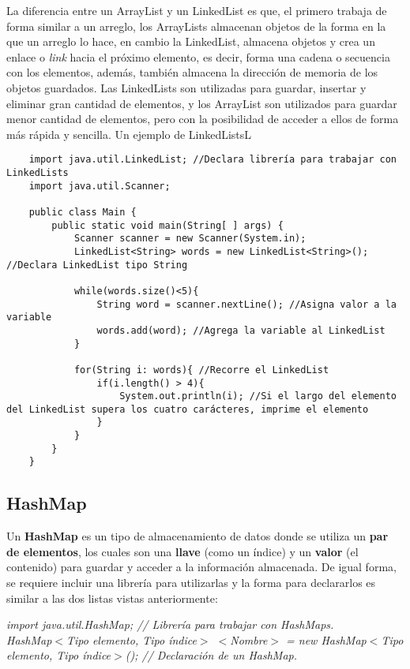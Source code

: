 La diferencia entre un ArrayList y un LinkedList es que, el primero trabaja de forma similar a un arreglo, los ArrayLists almacenan objetos de la forma en la que un arreglo lo hace, en cambio la LinkedList, almacena objetos y crea un enlace o \textit{link} hacia el próximo elemento, es decir, forma una cadena o secuencia con los elementos, además, también almacena la dirección de memoria de los objetos guardados. Las LinkedLists son utilizadas para guardar, insertar y eliminar gran cantidad de elementos, y los ArrayList son utilizados para guardar menor cantidad de elementos, pero con la posibilidad de acceder a ellos de forma más rápida y sencilla. Un ejemplo de LinkedListsL
\begin{lstlisting}
    import java.util.LinkedList; //Declara librería para trabajar con LinkedLists
    import java.util.Scanner;

    public class Main {
        public static void main(String[ ] args) {
	        Scanner scanner = new Scanner(System.in);
            LinkedList<String> words = new LinkedList<String>(); //Declara LinkedList tipo String
        
            while(words.size()<5){
                String word = scanner.nextLine(); //Asigna valor a la variable
                words.add(word); //Agrega la variable al LinkedList
            }
        
            for(String i: words){ //Recorre el LinkedList
                if(i.length() > 4){
                    System.out.println(i); //Si el largo del elemento del LinkedList supera los cuatro carácteres, imprime el elemento
                }
            }
        }
    }
\end{lstlisting}


\subsection{HashMap}
\hspace{0.55cm}Un \textbf{HashMap} es un tipo de almacenamiento de datos donde se utiliza un \textbf{par de elementos}, los cuales son una \textbf{llave} (como un índice) y un \textbf{valor} (el contenido) para guardar y acceder a la información almacenada. De igual forma, se requiere incluir una librería para utilizarlas y la forma para declararlos es similar a las dos listas vistas anteriormente:
\begin{center}
    \textit{
        import java.util.HashMap; // Librería para trabajar con HashMaps. \\
        HashMap$<$Tipo elemento, Tipo índice$>$ $<$Nombre$>$ = new HashMap$<$Tipo elemento, Tipo índice$>$(); // Declaración de un HashMap.
    }
\end{center}

